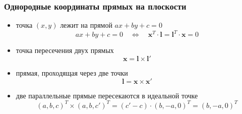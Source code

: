 \documentclass[12pt,usepdftitle=false,aspectratio=1610]{beamer}
\begin{document}
\begin{frame}
\frametitle{Однородные координаты прямых на плоскости}
\begin{itemize}
    \item точка $(x,y)$ лежит на прямой $ax+by+c=0$
    $$
        ax+by+c=0
        \quad\Leftrightarrow\quad
        \mathbf{x}^T\cdot\mathbf{l}=\mathbf{l}^T\cdot\mathbf{x}=0
    $$
    \item точка пересечения двух прямых 
    $$
        \mathbf{x}=\mathbf{l}\times\mathbf{l'}
    $$
    \item прямая, проходящая через две точки 
    $$
        \mathbf{l}=\mathbf{x}\times\mathbf{x'}
    $$
    \item две параллельные прямые пересекаются в идеальной точке
    $$
        (a,b,c)^T\times(a,b,c')^T=(c'-c)\cdot(b,-a,0)^T=(b,-a,0)^T
    $$
\end{itemize}
\end{frame}
\end{document}
